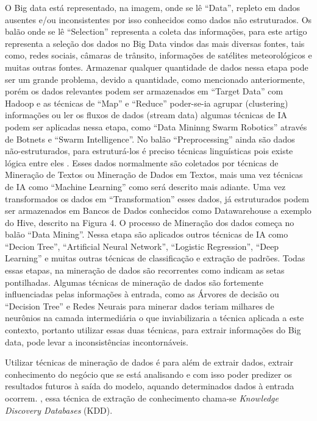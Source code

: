\documentclass[conference,compsoc]{IEEEtran}
\begin{document}
O Big data está representado, na imagem, onde se lê ``Data'', repleto em dados ausentes e/ou inconsistentes por isso conhecidos como dados não estruturados. Os balão onde se lê ``Selection'' representa a coleta das informações, para este artigo representa a seleção dos dados no Big Data vindos das mais diversas fontes, tais como, redes sociais, câmaras de trânsito, informações de satélites meteorológicos e muitas outras fontes. Armazenar qualquer quantidade de dados nessa etapa pode ser um grande problema, devido a quantidade, como mencionado anteriormente, porém os dados relevantes podem ser armazenados em ``Target Data'' com Hadoop e as técnicas de ``Map'' e ``Reduce'' poder-se-ia agrupar (clustering) informações ou ler os fluxos de dados (stream data) algumas técnicas de IA podem ser aplicadas nessa etapa, como ``Data Mininng Swarm Robotics'' através de Botnets e ``Swarm Intelligence''. No balão ``Preprocessing'' ainda são dados não-estruturados, para estruturá-los é preciso técnicas linguísticas pois existe lógica entre eles \cite{Aranha2006}. Esses dados normalmente são coletados por técnicas de Mineração de Textos ou Mineração de Dados em Textos, mais uma vez técnicas de IA como ``Machine Learning'' como será descrito mais adiante. Uma vez transformados os dados em ``Transformation'' esses dados, já estruturados podem ser armazenados em Bancos de Dados conhecidos como Datawarehouse a exemplo do Hive, descrito na Figura 4. O processo de Mineração dos dados começa no balão ``Data Mining''. Nessa etapa são aplicados outros técnicas de IA como ``Decion Tree'', ``Artificial Neural Network'', ``Logistic Regression'', ``Deep Learning'' e muitas outras técnicas de classificação e extração de padrões. Todas essas etapas, na mineração de dados são recorrentes como indicam as setas pontilhadas. Algumas técnicas de mineração de dados são fortemente influenciadas pelas informações à entrada, como as Árvores de decisão ou ``Decision Tree'' \cite{DecisionTree} e Redes Neurais para minerar dados teriam milhares de neurônios na camada intermediária o que inviabilizaria a técnica aplicada a este contexto, portanto utilizar essas duas técnicas, para extrair informações do Big data, pode levar a inconsistências incontornáveis.

\vspace{0.1cm}

Utilizar técnicas de mineração de dados é para além de extrair dados, extrair conhecimento do negócio que se está analisando e com isso poder predizer os resultados futuros à saída do modelo, aquando determinados dados à entrada ocorrem. \cite{Amin2015}, essa técnica de extração de conhecimento chama-se \textit{Knowledge Discovery Databases} (KDD).
\end{document}
